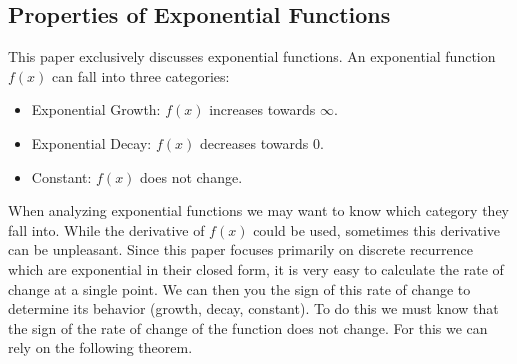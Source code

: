 \documentclass{article}
\begin{document}
\subsection{Properties of Exponential Functions}
This paper exclusively discusses exponential functions. An exponential function $f(x)$ can fall into three categories:
\begin{itemize}
    \item Exponential Growth: $f(x)$ increases towards $\infty$.
    \item Exponential Decay: $f(x)$ decreases towards 0.
    \item Constant: $f(x)$ does not change.
\end{itemize}
When analyzing exponential functions we may want to know which category they fall into. While the derivative of $f(x)$ could be used, sometimes this derivative can be unpleasant. Since this paper focuses primarily on discrete recurrence which are exponential in their closed form, it is very easy to calculate the rate of change at a single point. We can then you the sign of this rate of change to determine its behavior (growth, decay, constant). To do this we must know that the sign of the rate of change of the function does not change. For this we can rely on the following theorem.
\end{document}
